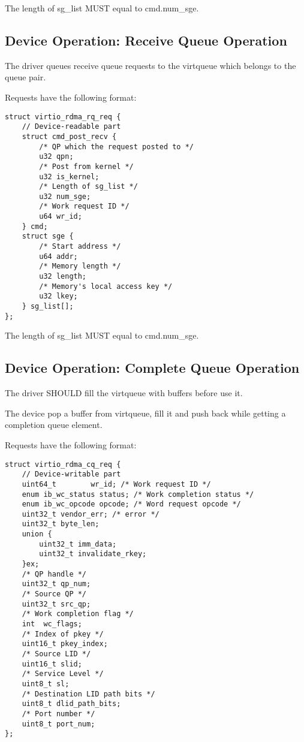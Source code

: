The length of sg_list MUST equal to cmd.num_sge.

\subsection{Device Operation: Receive Queue Operation}\label{sec:Device Types / RDMA Device / Receive Queue Operation}

The driver queues receive queue requests to the virtqueue which belongs to the queue pair.

Requests have the following format:

\begin{lstlisting}
struct virtio_rdma_rq_req {
    // Device-readable part
    struct cmd_post_recv {
        /* QP which the request posted to */
        u32 qpn;
        /* Post from kernel */
        u32 is_kernel;
        /* Length of sg_list */
        u32 num_sge;
        /* Work request ID */
        u64 wr_id;
    } cmd;
    struct sge {
        /* Start address */
        u64 addr;
        /* Memory length */
        u32 length;
        /* Memory's local access key */
        u32 lkey;
    } sg_list[];
};
\end{lstlisting}

The length of sg_list MUST equal to cmd.num_sge.

\subsection{Device Operation: Complete Queue Operation}\label{sec:Device Types / RDMA Device / Complete Queue Operation}

The driver SHOULD fill the virtqueue with buffers before use it.

The device pop a buffer from virtqueue, fill it and push back while getting a completion queue element.

Requests have the following format:

\begin{lstlisting}
struct virtio_rdma_cq_req {
    // Device-writable part
    uint64_t        wr_id; /* Work request ID */
    enum ib_wc_status status; /* Work completion status */
    enum ib_wc_opcode opcode; /* Word request opcode */
    uint32_t vendor_err; /* error */
    uint32_t byte_len;
    union {
        uint32_t imm_data;
        uint32_t invalidate_rkey;
    }ex;
    /* QP handle */
    uint32_t qp_num;
    /* Source QP */
    uint32_t src_qp;
    /* Work completion flag */
    int  wc_flags;
    /* Index of pkey */
    uint16_t pkey_index;
    /* Source LID */
    uint16_t slid;
    /* Service Level */
    uint8_t sl;
    /* Destination LID path bits */
    uint8_t dlid_path_bits;
    /* Port number */
    uint8_t port_num;
};
\end{lstlisting}
